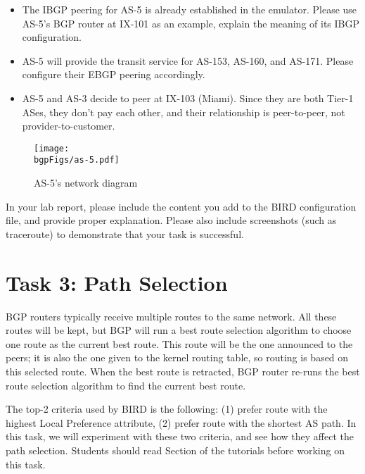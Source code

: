 \begin{itemize}
  \item The IBGP peering for AS-5 is already established in the 
    emulator. Please use AS-5's BGP router at IX-101 as an example,
    explain the meaning of its IBGP configuration.

  \item AS-5 will provide the transit service for AS-153, AS-160, and AS-171. 
    Please configure their EBGP peering accordingly.

  \item AS-5 and AS-3 decide to peer at IX-103 (Miami). 
    Since they are both Tier-1 ASes, they don't pay each other, 
    and their relationship is peer-to-peer, not provider-to-customer.
\end{itemize}


\begin{figure}[htb]
  \begin{center}
    \texttt{[image: \\bgpFigs/as-5.pdf]}
  \end{center}
  \caption{AS-5's network diagram}
  \label{bgp:fig:as5}
\end{figure}


In your lab report, please include the content you add to the 
BIRD configuration file, and provide proper explanation.
Please also include screenshots (such as traceroute) to demonstrate 
that your task is successful. 



\section{Task 3: Path Selection} 

BGP routers typically receive multiple routes to the same network. 
All these routes will be kept, but BGP will run a best route 
selection algorithm to choose one route as the current best route. 
This route will be the one announced to the peers; 
it is also the one given to the kernel routing table, 
so routing is based on this selected route. 
When the best route is retracted, BGP router re-runs the 
best route selection algorithm to find the current best route. 

The top-2 criteria used by BIRD is the following:
(1) prefer route with the highest Local Preference attribute,
(2) prefer route with the shortest AS path. In this task, we will
experiment with these two criteria, and see how they affect 
the path selection. Students should read Section \pathselection 
of the tutorials before working on this task.



